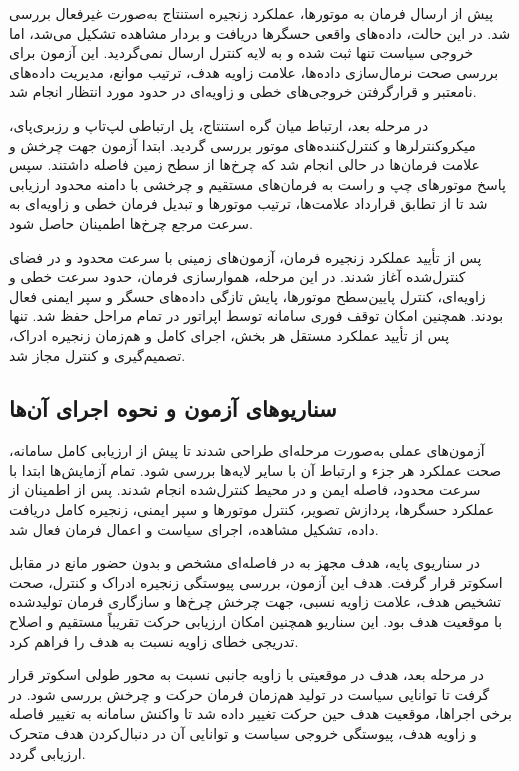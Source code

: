 پیش از ارسال فرمان به موتورها، عملکرد زنجیره استنتاج به‌صورت غیرفعال بررسی شد. در این حالت، داده‌های واقعی حسگرها دریافت و بردار مشاهده تشکیل می‌شد، اما خروجی سیاست تنها ثبت شده و به لایه کنترل ارسال نمی‌گردید. این آزمون برای بررسی صحت نرمال‌سازی داده‌ها، علامت زاویه هدف، ترتیب موانع، مدیریت داده‌های نامعتبر و قرارگرفتن خروجی‌های خطی و زاویه‌ای در حدود مورد انتظار انجام شد.

در مرحله بعد، ارتباط میان گره استنتاج، پل ارتباطی لپ‌تاپ و رزبری‌پای، میکروکنترلرها و کنترل‌کننده‌های موتور بررسی گردید. ابتدا آزمون جهت چرخش و علامت فرمان‌ها در حالی انجام شد که چرخ‌ها از سطح زمین فاصله داشتند. سپس پاسخ موتورهای چپ و راست به فرمان‌های مستقیم و چرخشی با دامنه محدود ارزیابی شد تا از تطابق قرارداد علامت‌ها، ترتیب موتورها و تبدیل فرمان خطی و زاویه‌ای به سرعت مرجع چرخ‌ها اطمینان حاصل شود.

پس از تأیید عملکرد زنجیره فرمان، آزمون‌های زمینی با سرعت محدود و در فضای کنترل‌شده آغاز شدند. در این مرحله، هموارسازی فرمان، حدود سرعت خطی و زاویه‌ای، کنترل پایین‌سطح موتورها، پایش تازگی داده‌های حسگر و سپر ایمنی فعال بودند. همچنین امکان توقف فوری سامانه توسط اپراتور در تمام مراحل حفظ شد. تنها پس از تأیید عملکرد مستقل هر بخش، اجرای کامل و هم‌زمان زنجیره ادراک، تصمیم‌گیری و کنترل مجاز شد.

\subsection{سناریوهای آزمون و نحوه اجرای آن‌ها}
\label{subsec:real_test_scenarios_execution}

آزمون‌های عملی به‌صورت مرحله‌ای طراحی شدند تا پیش از ارزیابی کامل سامانه، صحت عملکرد هر جزء و ارتباط آن با سایر لایه‌ها بررسی شود. تمام آزمایش‌ها ابتدا با سرعت محدود، فاصله ایمن و در محیط کنترل‌شده انجام شدند. پس از اطمینان از عملکرد حسگرها، پردازش تصویر، کنترل موتورها و سپر ایمنی، زنجیره کامل دریافت داده، تشکیل مشاهده، اجرای سیاست و اعمال فرمان فعال شد.

در سناریوی پایه، هدف مجهز به  در فاصله‌ای مشخص و بدون حضور مانع در مقابل اسکوتر قرار گرفت. هدف این آزمون، بررسی پیوستگی زنجیره ادراک و کنترل، صحت تشخیص هدف، علامت زاویه نسبی، جهت چرخش چرخ‌ها و سازگاری فرمان تولیدشده با موقعیت هدف بود. این سناریو همچنین امکان ارزیابی حرکت تقریباً مستقیم و اصلاح تدریجی خطای زاویه نسبت به هدف را فراهم کرد.

در مرحله بعد، هدف در موقعیتی با زاویه جانبی نسبت به محور طولی اسکوتر قرار گرفت تا توانایی سیاست در تولید هم‌زمان فرمان حرکت و چرخش بررسی شود. در برخی اجراها، موقعیت هدف حین حرکت تغییر داده شد تا واکنش سامانه به تغییر فاصله و زاویه هدف، پیوستگی خروجی سیاست و توانایی آن در دنبال‌کردن هدف متحرک ارزیابی گردد.

